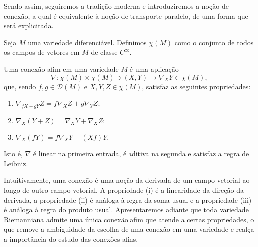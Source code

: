 Sendo assim, seguiremos a tradição moderna e introduziremos a noção de conexão, a qual é equivalente à noção de transporte paralelo, de uma forma que será explicitada.
\begin{definition}
	\label{def:conjunto-campos-de-vetores}
	Seja $M$ uma variedade diferenciável. Definimos $\chi(M)$ como o conjunto de todos os campos de vetores em $M$ de classe $C^{\infty}$.
\end{definition}
\begin{definition}
	\label{def:conexao-afim}
	Uma conexão afim em uma variedade $M$ é uma aplicação
	\begin{equation*}
		\nabla:\chi(M)\times \chi(M) \ni (X, Y) \rightarrow \nabla_{X}Y \in \chi(M),
	\end{equation*}
	que, sendo $f, g \in \mathcal{D}(M)$ e $X, Y, Z \in \chi(M)$, satisfaz as seguintes propriedades:
	\begin{enumerate}[label=(\roman*)]
		\item $\nabla_{fX+gY}Z=f\nabla_{X}Z + g\nabla_{Y}Z$;
		\item $\nabla_{X}(Y+Z)=\nabla _XY+\nabla_{X}Z$;
		\item $\nabla_{X}(fY)=f\nabla_{X}Y+(Xf)Y$.
	\end{enumerate}

	Isto é, $\nabla$ é linear na primeira entrada, é aditiva na segunda e satisfaz a regra de Leibniz.
\end{definition}
Intuitivamente, uma conexão é uma noção da derivada de um campo vetorial ao longo de outro campo vetorial. A propriedade (i) é a linearidade da direção da derivada, a propriedade (ii) é análoga à regra da soma usual e a propriedade (iii) é análoga à regra do produto usual.  Apresentaremos adiante que toda variedade Riemanniana admite uma única conexão afim que atende a certas propriedades, o que remove a ambiguidade da escolha de uma conexão em uma variedade e realça a importância do estudo das conexões afins.
